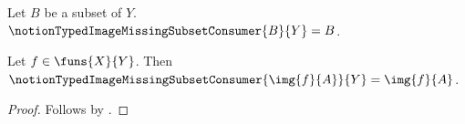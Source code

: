 

\begin{definition}\label{notion_typed_image_missing_subset_consumer}
    Let $B$ be a subset of $Y$.
    $\notionTypedImageMissingSubsetConsumer{B}{Y}=B$.
\end{definition}

\begin{proposition}\label{notion_typed_image_missing_subset}
    Let $f\in\funs{X}{Y}$.
    Then $\notionTypedImageMissingSubsetConsumer{\img{f}{A}}{Y}=\img{f}{A}$.
\end{proposition}
\begin{proof}
    Follows by .
\end{proof}
